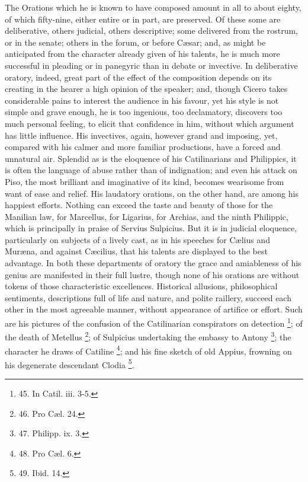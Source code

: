 The Orations which he is known
to have composed amount in all to about eighty, of which fifty-nine,
either entire or in part, are preserved. Of these some are
deliberative, others judicial, others descriptive; some delivered from
the rostrum, or in the senate; others in the forum, or before Cæsar;
and, as might be anticipated from the character already given of his
talents, he is much more successful in pleading or in panegyric than
in debate or invective. In deliberative oratory, indeed, great part of
the effect of the composition depends on its creating in the hearer a
high opinion of the speaker; and, though Cicero takes considerable
pains to interest the audience in his favour, yet his style is not
simple and grave enough, he is too ingenious, too declamatory,
discovers too much personal feeling, to elicit that confidence in him,
without which argument has little influence. His invectives, again,
however grand and imposing, yet, compared with his calmer and more
familiar productions, have a forced and unnatural air. Splendid as is
the eloquence of his Catilinarians and Philippics, it is often the
language of abuse rather than of indignation; and even his attack on
Piso, the most brilliant and imaginative of its kind, becomes
wearisome from want of ease and relief. His laudatory orations, on the
other hand, are among his happiest efforts. Nothing can exceed the
taste and beauty of those for the Manilian law, for Marcellus, for
Ligarius, for Archias, and the ninth Philippic, which is principally
in praise of Servius Sulpicius. But it is in judicial eloquence,
particularly on subjects of a lively cast, as in his speeches for Cælius
and Muræna, and against Cæcilius, that his talents are displayed to
the best advantage. In both these departments of oratory the
grace and amiableness of his genius are manifested in their full
lustre, though none of his orations are without tokens of those
characteristic excellences. Historical allusions, philosophical
sentiments, descriptions full of life and nature, and polite raillery,
succeed each other in the most agreeable manner, without appearance of
artifice or effort. Such are his pictures of the confusion of the
Catilinarian conspirators on detection \footnote{45. In Catil. iii. 3-5.}; of the death of
Metellus \footnote{46. Pro
Cæl. 24.}; of Sulpicius undertaking the embassy to Antony
\footnote{47. Philipp. ix. 3.}; the character he draws of Catiline
\footnote{48. Pro
Cæl. 6.}; and his fine
sketch of old Appius, frowning on his degenerate descendant Clodia \footnote{49. Ibid. 14.}.

